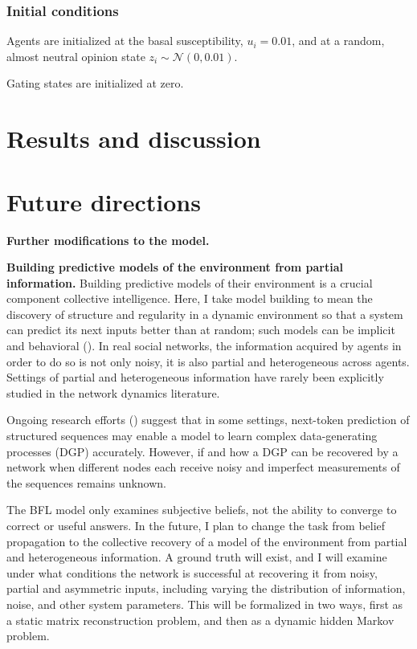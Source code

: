 \documentclass[]{article}
\begin{document}
\subsubsection{Initial conditions}
Agents are initialized at the basal susceptibility, $u_i = 0.01$, and at a random, almost neutral opinion state $z_i \sim \mathcal{N}(0, 0.01)$.

Gating states are initialized at zero.



\section{Results and discussion}






\newpage

\section{Future directions}

\textbf{Further modifications to the model.}


\textbf{Building predictive models of the environment from partial information.} Building predictive models of their environment is a crucial component collective intelligence. Here, I take model building to mean the discovery of structure and regularity in a dynamic environment so that a system can predict its next inputs better than at random; such models can be implicit and behavioral (\cite{crutchfieldCalculiEmergenceComputation1994}). In real social networks, the information acquired by agents in order to do so is not only noisy, it is also partial and heterogeneous across agents. Settings of partial and heterogeneous information have rarely been explicitly studied in the network dynamics literature.

Ongoing research efforts (\cite{malachAutoRegressiveNextTokenPredictors2023}) suggest that in some settings, next-token prediction of structured sequences may enable a model to learn complex data-generating processes (DGP) accurately. However, if and how a DGP can be recovered by a network when different nodes each receive noisy and imperfect measurements of the sequences remains unknown.

The BFL model only examines subjective beliefs, not the ability to converge to correct or useful answers. In the future, I plan to change the task from belief propagation to the collective recovery of a model of the environment from partial and heterogeneous information. A ground truth will exist, and I will examine under what conditions the network is successful at recovering it from noisy, partial and asymmetric inputs, including varying the distribution of information, noise, and other system parameters. This will be formalized in two ways, first as a static matrix reconstruction problem, and then as a dynamic hidden Markov problem.
\end{document}
